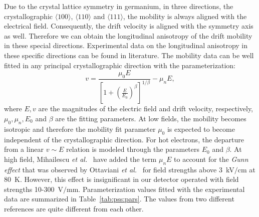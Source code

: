 Due to the crystal lattice symmetry in germanium, in three directions, the crystallographic $\langle100\rangle$, $\langle110\rangle$ and $\langle111\rangle$, the mobility is always aligned with the electrical field. Consequently, the drift velocity is aligned with the symmetry axis as well. Therefore we can obtain the longitudinal anisotropy of the drift mobility in these special directions. Experimental data on the longitudinal anisotropy in these specific directions can be found in literature. The mobility data can be well fitted in any principal crystallographic direction with the parameterization:
\begin{equation}
  \label{eq:pss:para}
  v = \frac{\mu_{0}E}{[1+(\frac{E}{E_{0}})^{\beta}]^{1/\beta}} -   \mu_{n}E,
\end{equation}
where $E, v$ are the magnitudes of the electric field and drift velocity, respectively, $\mu_{0}, \mu_{n}, E_{0}$ and $\beta$ are the fitting parameters. At low fields, the mobility becomes isotropic and therefore the mobility fit parameter $\mu_{0}$ is expected to become independent of the crystallographic direction. For hot electrons, the departure from a linear $v \sim E$ relation is modeled through the parameters $E_{0}$ and $\beta$. At high field, Mihailescu \textit{et   al.}~\cite{miha} have added the term $\mu_{n}E$ to account for the \emph{Gunn effect} that was observed by Ottaviani \textit{et   al.}~\cite{otta} for field strengths above 3~kV$/$cm at 80~K. However, this effect is insignificant in our detector operated with field strengths 10-300~V$/$mm. Parameterization values fitted with the experimental data are summarized in Table~\ref{tab:pss:pars}. The values from two different references are quite different from each other.

